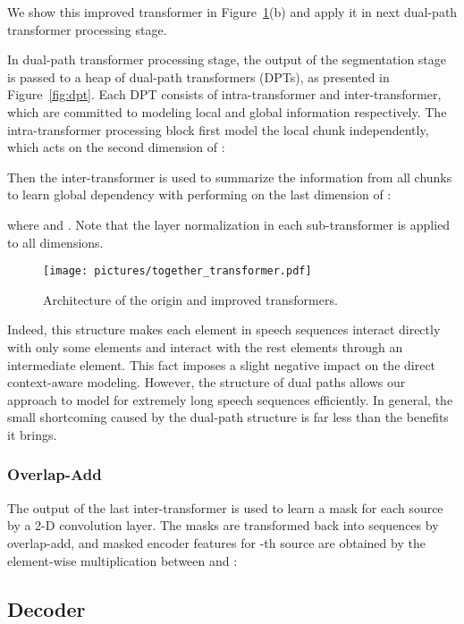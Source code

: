 \documentclass[a4paper]{article}
\begin{document}
We show this improved transformer in Figure~\ref{fig:transformers}(b) and apply it in next dual-path transformer processing stage.

In dual-path transformer processing stage, the output  of the segmentation stage is passed to a heap of  dual-path transformers (DPTs), as presented in Figure~\ref{fig:dpt}. Each DPT consists of intra-transformer and inter-transformer, which are committed to modeling local and global information respectively. The intra-transformer processing block first model the local chunk independently, which acts on the second dimension of :

Then the inter-transformer is used to summarize the information from all chunks to learn global dependency with performing on the last dimension of :

where  and . Note that the layer normalization in each sub-transformer is applied to all dimensions.

\begin{figure}[t]
  \centering
  \texttt{[image: pictures/together\_transformer.pdf]}
  \caption{Architecture of the origin and improved transformers.}
  \label{fig:transformers}
\end{figure}

Indeed, this structure makes each element in speech sequences interact directly with only some elements and interact with the rest elements through an intermediate element. This fact imposes a slight negative impact on the direct context-aware modeling. However, the structure of dual paths allows our approach to model for extremely long speech sequences efficiently. In general, the small shortcoming caused by the dual-path structure is far less than the benefits it brings.


\subsubsection{Overlap-Add}
The output of the last inter-transformer 
is used to learn a mask for each source by a 2-D convolution layer. The masks are transformed back into sequences  by overlap-add, and masked encoder features for -th source are obtained by the element-wise multiplication between  and :



\subsection{Decoder}
\end{document}
